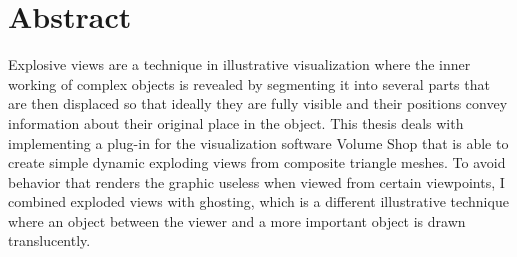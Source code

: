 %
%
%
%
%
%


\chapter*{Abstract}

Explosive views are a technique in illustrative visualization where the inner working of complex objects is revealed by segmenting it into several parts that are then displaced so that ideally they are fully visible and their positions convey information about their original place in the object. This thesis deals with implementing a plug-in for the visualization software Volume Shop that is able to create simple dynamic exploding views from composite triangle meshes. To avoid behavior that renders the graphic useless when viewed from certain viewpoints, I combined exploded views with ghosting, which is a different illustrative technique where an object between the viewer and a more important object is drawn translucently.